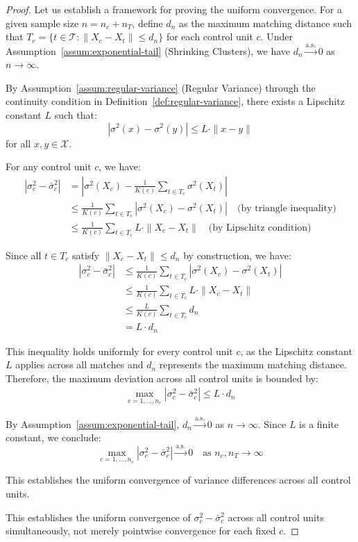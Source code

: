\documentclass{mytemplate}
\begin{document}
\begin{proof}
Let us establish a framework for proving the uniform convergence. For a given sample size $n = n_c + n_T$, define $d_n$ as the maximum matching distance such that $T_c = \{t \in \mathcal{T}: \|X_c - X_t\| \leq d_n\}$ for each control unit $c$. Under Assumption~\ref{assum:exponential-tail} (Shrinking Clusters), we have $d_n \xrightarrow{\text{a.s.}} 0$ as $n \to \infty$.

By Assumption~\ref{assum:regular-variance} (Regular Variance) through the continuity condition in Definition~\ref{def:regular-variance}, there exists a Lipschitz constant $L$ such that:
\begin{equation}
|\sigma^2(x) - \sigma^2(y)| \leq L \cdot \|x - y\|
\end{equation}
for all $x, y \in \mathcal{X}$.

For any control unit $c$, we have:
\begin{align*}
|\sigma_c^2 - \bar{\sigma}_c^2| &= \left|\sigma^2(X_c) - \frac{1}{K(c)}\sum_{t \in T_c}\sigma^2(X_t)\right| \\
&\leq \frac{1}{K(c)}\sum_{t \in T_c}|\sigma^2(X_c) - \sigma^2(X_t)| \quad \text{(by triangle inequality)} \\
&\leq \frac{1}{K(c)}\sum_{t \in T_c}L \cdot \|X_c - X_t\| \quad \text{(by Lipschitz condition)}
\end{align*}

Since all $t \in T_c$ satisfy $\|X_c - X_t\| \leq d_n$ by construction, we have:
\begin{align*}
|\sigma_c^2 - \bar{\sigma}_c^2| &\leq \frac{1}{K(c)}\sum_{t \in T_c}|\sigma^2(X_c) - \sigma^2(X_t)| \\
&\leq \frac{1}{K(c)}\sum_{t \in T_c}L \cdot \|X_c - X_t\| \\
&\leq \frac{L}{K(c)}\sum_{t \in T_c} d_n \\
&= L \cdot d_n
\end{align*}

This inequality holds uniformly for every control unit $c$, as the Lipschitz constant $L$ applies across all matches and $d_n$ represents the maximum matching distance. Therefore, the maximum deviation across all control units is bounded by:
\begin{align*}
\max_{c=1,\ldots,n_c}|\sigma_c^2 - \bar{\sigma}_c^2| \leq L \cdot d_n
\end{align*}

By Assumption~\ref{assum:exponential-tail}, $d_n \xrightarrow{\text{a.s.}} 0$ as $n \to \infty$. Since $L$ is a finite constant, we conclude:
\begin{equation}
\max_{c=1,\ldots,n_c}|\sigma_c^2 - \bar{\sigma}_c^2| \xrightarrow{\text{a.s.}} 0 \quad \text{as } n_c, n_T \to \infty
\end{equation}

This establishes the uniform convergence of variance differences across all control units.

This establishes the uniform convergence of $\sigma_c^2 - \bar{\sigma}_c^2$ across all control units simultaneously, not merely pointwise convergence for each fixed $c$.
\end{proof}
\end{document}
